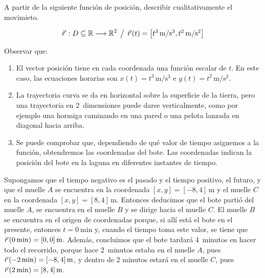 \begin{mdframed}[style=ExampleFrame]
    \begin{example}
        \label{eg:boatPosition}
    \end{example}
    \begin{formatI}
        A partir de la siguiente función de posición, describir cualitativamente el movimieto.
    \end{formatI}
    \begin{equation*}
        \vec{r}\hspace{0.05cm}:D \subseteq \mathbb{R} \longrightarrow \mathbb{R}^2 \hspace{1ex} \big/ \hspace{1ex} \vec{r}\hspace{0.05cm}(t) = { \begin{bmatrix} t^3\,\si{\metre\per\second^3}, t^2\,\si{\metre\per\second^2} \end{bmatrix} }
    \end{equation*}

    \begin{center}
        \def\svgwidth{\linewidth}
        
    \end{center}

Observar que:
    \begin{enumerate}
        \item El vector posición tiene en cada coordenada una función escalar de $t$.
        En este caso, las ecuaciones horarias son $x(t) = t^3\,\si{\metre\per\second^3}$ e $y(t) = t^2\,\si{\metre\per\second^2}$.
        \item La trayectoria curva se da en horizontal sobre la superficie de la tierra, pero una trayectoria en 2~dimensiones puede darse verticalmente, como por ejemplo una hormiga caminando en una pared o una pelota lanzada en diagonal hacia arriba.
        \item Se puede comprobar que, dependiendo de qué valor de tiempo asignemos a la función, obtendremos las coordenadas del bote.
        Las coordenadas indican la posición del bote en la laguna en diferentes instantes de tiempo.
    \end{enumerate}

    Supongamos que el tiempo negativo es el pasado y el tiempo positivo, el futuro, y que el muelle $A$ se encuentra en la coordenada $[x,y] = [-8,4]\,\si{\metre}$ y el muelle $C$ en la coordenada $[x,y] = [8,4]\,\si{\metre}$.
    Entonces deducimos que el bote partió del muelle $A$, se encuentra en el muelle $B$ y se dirige hacia el muelle $C$.
    El muelle $B$ se encuentra en el origen de coordenadas porque, si allí está el bote en el presente, entonces $t = \SI{0}{\minute}$ y, cuando el tiempo toma este valor, se tiene que $\vec{r}\hspace{0.05cm}(\SI{0}{\minute}) = [0,0]\,\si{\metre}$.
    Además, concluimos que el bote tardará 4~minutos en hacer todo el recorrido, porque hace 2~minutos estaba en el muelle $A$, pues $\vec{r}\hspace{0.05cm}(\SI{-2}{\minute}) = [-8,4]\,\si{\metre}$, y dentro de 2 minutos estará en el muelle $C$, pues $\vec{r}\hspace{0.05cm}(\SI{2}{\minute}) = [8,4]\,\si{\metre}$.
\end{mdframed}

